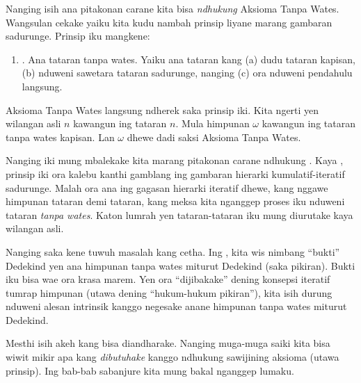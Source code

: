 \documentclass[../../../include/open-logic-section]{subfiles}
\begin{document}
Nanging isih ana pitakonan carane kita bisa \emph{ndhukung}
Aksioma Tanpa Wates. Wangsulan cekake yaiku kita kudu
nambah prinsip liyane marang gambaran sadurunge.
Prinsip iku mangkene:
\begin{enumerate}
	\item[] \stagesinf. Ana tataran tanpa wates. Yaiku ana
	tataran kang (a) dudu tataran kapisan, (b) nduweni
	sawetara tataran sadurunge, nanging (c) ora nduweni
	pendahulu langsung.
\end{enumerate}
Aksioma Tanpa Wates langsung ndherek saka prinsip iki.
Kita ngerti yen wilangan asli $n$ kawangun ing tataran $n$.
Mula himpunan $\omega$ kawangun ing tataran tanpa wates
kapisan. Lan $\omega$ dhewe dadi saksi Aksioma Tanpa Wates.

Nanging iki mung mbalekake kita marang pitakonan carane
ndhukung \stagesinf. Kaya \stagessucc, prinsip iki ora
kalebu kanthi gamblang ing gambaran hierarki
kumulatif-iteratif sadurunge. Malah ora ana ing gagasan
hierarki iteratif dhewe, kang nggawe himpunan tataran
demi tataran, kang meksa kita nganggep proses iku
nduweni tataran \emph{tanpa wates}. Katon lumrah yen
tataran-tataran iku mung diurutake kaya wilangan asli.

Nanging saka kene tuwuh masalah kang cetha. Ing
, kita wis
nimbang ``bukti'' Dedekind yen ana himpunan tanpa wates
miturut Dedekind (saka pikiran). Bukti iku bisa wae
ora krasa marem. Yen \stagesinf{} ora ``dijibakake''
dening konsepsi iteratif tumrap himpunan (utawa dening
``hukum-hukum pikiran''), kita isih durung nduweni
alesan intrinsik kanggo negesake anane himpunan
tanpa wates miturut Dedekind.

Mesthi isih akeh kang bisa diandharake. Nanging muga-muga
saiki kita bisa wiwit mikir apa kang \emph{dibutuhake}
kanggo ndhukung sawijining aksioma (utawa prinsip).
Ing bab-bab sabanjure kita mung bakal nganggep \stagesinf{}
lumaku.
\end{document}
